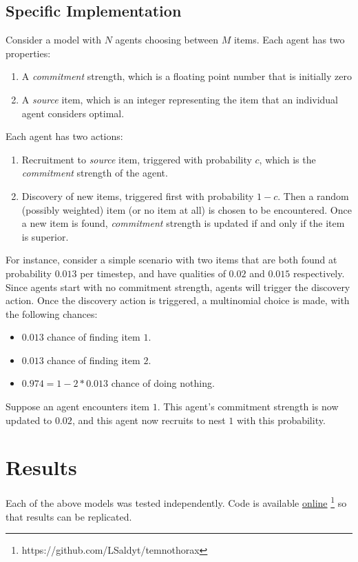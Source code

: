 \documentclass{article}
\begin{document}
\subsection{Specific Implementation}
Consider a model with $N$ agents choosing between $M$ items.
Each agent has two properties:
\begin{enumerate}
    \item A \emph{commitment} strength, which is a floating point number that is initially zero
    \item A \emph{source} item, which is an integer representing the item that an individual agent considers optimal.
\end{enumerate}
Each agent has two actions:
\begin{enumerate}
    \item Recruitment to \emph{source} item, triggered with probability $c$, which is the \emph{commitment} strength of the agent.
    \item Discovery of new items, triggered first with probability $1 - c$. Then a random (possibly weighted) item (or no item at all) is chosen to be encountered. Once a new item is found, \emph{commitment} strength is updated if and only if the item is superior.
\end{enumerate}

For instance, consider a simple scenario with two items that are both found at probability $0.013$ per timestep, and have qualities of $0.02$ and $0.015$ respectively.
Since agents start with no commitment strength, agents will trigger the discovery action.
Once the discovery action is triggered, a multinomial choice is made, with the following chances:
\begin{itemize}
    \item $0.013$ chance of finding item $1$.
    \item $0.013$ chance of finding item $2$.
    \item $0.974 = 1 - 2 * 0.013$ chance of doing nothing.
\end{itemize}

Suppose an agent encounters item $1$. This agent's commitment strength is now updated to $0.02$, and this agent now recruits to nest $1$ with this probability.

\section{Results}

Each of the above models was tested independently. Code is available \href{https://github.com/LSaldyt/temnothorax}{online} \footnote{https://github.com/LSaldyt/temnothorax} so that results can be replicated. 
\end{document}
